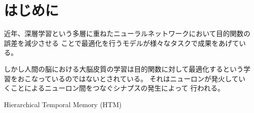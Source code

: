 \chapter{はじめに}
近年、深層学習という多層に重ねたニューラルネットワークにおいて目的関数の誤差を減少させる
ことで最適化を行うモデルが様々なタスクで成果をあげている。

しかし人間の脳における大脳皮質の学習は目的関数に対して最適化するという学習をおこなっているのではないとされている。\cite{htm}
それはニューロンが発火していくことによるニューロン間をつなぐシナプスの発生によって
行われる。

Hierarchical Temporal Memory (HTM)
